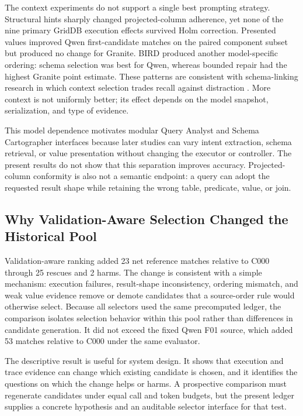 \documentclass[applsci,article,submit,moreauthors]{Definitions/mdpi}
\begin{document}
The context experiments do not support a single best prompting strategy. Structural hints sharply changed projected-column adherence, yet none of the nine primary GridDB execution effects survived Holm correction. Presented values improved Qwen first-candidate matches on the paired component subset but produced no change for Granite. BIRD produced another model-specific ordering: schema selection was best for Qwen, whereas bounded repair had the highest Granite point estimate. These patterns are consistent with schema-linking research in which context selection trades recall against distraction \cite{bozdemir2026schema,liu2025solidsql,hao2025genlink}. More context is not uniformly better; its effect depends on the model snapshot, serialization, and type of evidence.

This model dependence motivates modular Query Analyst and Schema Cartographer interfaces because later studies can vary intent extraction, schema retrieval, or value presentation without changing the executor or controller. The present results do not show that this separation improves accuracy. Projected-column conformity is also not a semantic endpoint: a query can adopt the requested result shape while retaining the wrong table, predicate, value, or join.

\subsection{Why Validation-Aware Selection Changed the Historical Pool}

Validation-aware ranking added 23 net reference matches relative to C000 through 25 rescues and 2 harms. The change is consistent with a simple mechanism: execution failures, result-shape inconsistency, ordering mismatch, and weak value evidence remove or demote candidates that a source-order rule would otherwise select. Because all selectors used the same precomputed ledger, the comparison isolates selection behavior within this pool rather than differences in candidate generation. It did not exceed the fixed Qwen F01 source, which added 53 matches relative to C000 under the same evaluator.

The descriptive result is useful for system design. It shows that execution and trace evidence can change which existing candidate is chosen, and it identifies the questions on which the change helps or harms. A prospective comparison must regenerate candidates under equal call and token budgets, but the present ledger supplies a concrete hypothesis and an auditable selector interface for that test.
\end{document}
